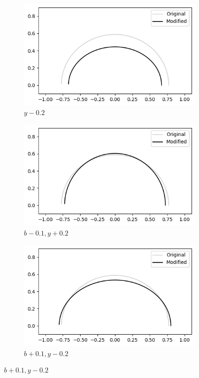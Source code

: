 \documentclass[a4paper]{report}
\begin{document}
\begin{figure}[ht]
      \medskip

    \begin{subfigure}{.3\linewidth}
        \includegraphics[width=\linewidth]{images/deformations/lower_y.png}
        \caption{$y - 0.2$}
        \label{fig:lower_y}
      \end{subfigure}\hfill
      \begin{subfigure}{.3\linewidth}
        \includegraphics[width=\linewidth]{images/deformations/mixing_b_y.png}
        \caption{$b - 0.1, y + 0.2$}
        \label{fig:mixing_b_y}
      \end{subfigure}\hfill
      \begin{subfigure}{.3\linewidth}
        \includegraphics[width=\linewidth]{images/deformations/mixing_b_y_v2.png}
        \caption{$b + 0.1, y - 0.2$}
        \label{fig:mixing_b_y_v2}
      \end{subfigure}
    

\end{figure}
\end{document}

